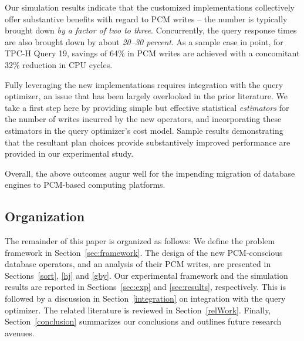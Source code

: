 Our simulation results indicate that the customized implementations
collectively offer substantive benefits with regard to PCM writes --
the number is typically brought down \emph{by a factor of two to three}.
Concurrently, the query response times are also brought down by about
\emph{20--30 percent}. As a sample case in point, for TPC-H Query 19,
savings of 64\% in PCM writes are achieved with a concomitant 32\%
reduction in CPU cycles. 

Fully leveraging the new implementations requires integration with
the query optimizer, an issue that has been largely overlooked in
the prior literature. We take a first step here by providing simple
but effective statistical \emph{estimators} for the number of writes
incurred by the new operators,
and incorporating these estimators in the query optimizer's cost model.
Sample results demonstrating that the resultant plan choices provide
substantively improved performance are provided in our experimental study.

Overall, the above outcomes augur well for the impending migration
of database engines to PCM-based computing platforms.

\subsection*{Organization}
The remainder of this paper is organized as follows: We define the
problem framework in Section~\ref{sec:framework}. The design of the new
PCM-conscious database operators, and an analysis of their PCM writes,
are presented in Sections~\ref{sort}, \ref{hj} and \ref{gby}.
Our experimental framework and the simulation results are reported in
Sections~\ref{sec:exp} and \ref{sec:results}, respectively. This is followed by a
discussion in Section~\ref{integration} on integration with the query optimizer. 
The related literature is reviewed in Section~\ref{relWork}. Finally,
Section~\ref{conclusion} summarizes our conclusions and outlines future
research avenues.

